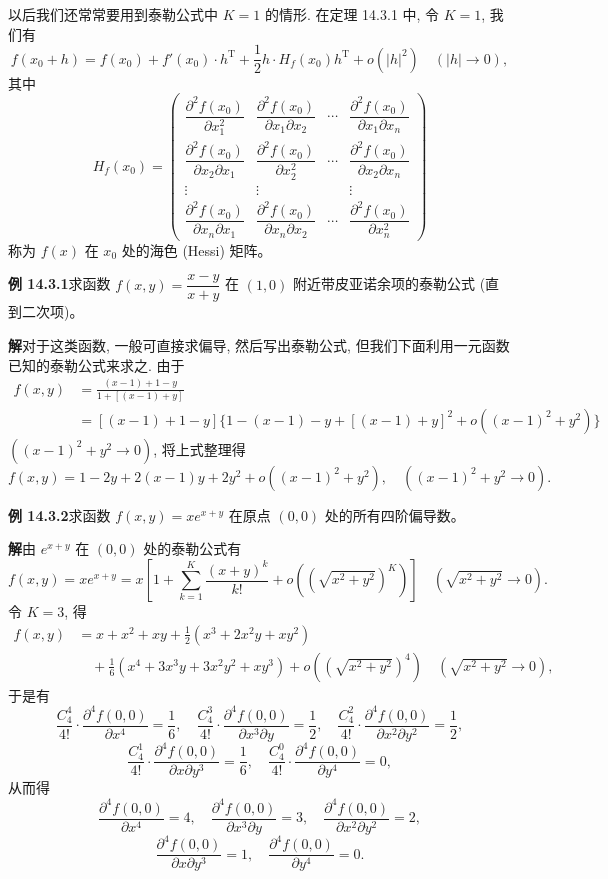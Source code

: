 \documentclass[UTF8,12pt,a4paper,fontset=fandol]{ctexart}
\begin{document}
以后我们还常常要用到泰勒公式中 $K=1$ 的情形. 在定理 14.3.1 中, 令 $K=1$, 我们有
\[
  f(x_0+h)=f(x_0)+f'(x_0)\cdot h^\mathrm T
  +\frac12 h\cdot H_f(x_0)h^\mathrm T+o(|h|^2)
  \quad(|h|\to0),
\]
其中
\[
  H_f(x_0)=
  \begin{pmatrix}
    \dfrac{\partial^2 f(x_0)}{\partial x_1^2} &
    \dfrac{\partial^2 f(x_0)}{\partial x_1\partial x_2} &
    \cdots &
    \dfrac{\partial^2 f(x_0)}{\partial x_1\partial x_n}\\
    \dfrac{\partial^2 f(x_0)}{\partial x_2\partial x_1} &
    \dfrac{\partial^2 f(x_0)}{\partial x_2^2} &
    \cdots &
    \dfrac{\partial^2 f(x_0)}{\partial x_2\partial x_n}\\
    \vdots & \vdots & & \vdots\\
    \dfrac{\partial^2 f(x_0)}{\partial x_n\partial x_1} &
    \dfrac{\partial^2 f(x_0)}{\partial x_n\partial x_2} &
    \cdots &
    \dfrac{\partial^2 f(x_0)}{\partial x_n^2}
  \end{pmatrix}
\]
称为 $f(x)$ 在 $x_0$ 处的海色 (Hessi) 矩阵。

\noindent\textbf{例 14.3.1}\quad 求函数 $f(x,y)=\dfrac{x-y}{x+y}$ 在 $(1,0)$ 附近带皮亚诺余项的泰勒公式 (直到二次项)。

\noindent\textbf{解}\quad 对于这类函数, 一般可直接求偏导, 然后写出泰勒公式, 但我们下面利用一元函数已知的泰勒公式来求之. 由于
\[
\begin{aligned}
  f(x,y)
  &=\frac{(x-1)+1-y}{1+[(x-1)+y]}\\
  &=[(x-1)+1-y]\{1-(x-1)-y+[(x-1)+y]^2
  +o((x-1)^2+y^2)\}
\end{aligned}
\]
$((x-1)^2+y^2\to0)$, 将上式整理得
\[
  f(x,y)=1-2y+2(x-1)y+2y^2+o((x-1)^2+y^2),
  \quad ((x-1)^2+y^2\to0).
\]

\noindent\textbf{例 14.3.2}\quad 求函数 $f(x,y)=xe^{x+y}$ 在原点 $(0,0)$ 处的所有四阶偏导数。

\noindent\textbf{解}\quad 由 $e^{x+y}$ 在 $(0,0)$ 处的泰勒公式有
\[
  f(x,y)=xe^{x+y}
  =x\left[1+\sum_{k=1}^K\frac{(x+y)^k}{k!}
  +o\left((\sqrt{x^2+y^2})^K\right)\right]
  \quad(\sqrt{x^2+y^2}\to0).
\]
令 $K=3$, 得
\[
\begin{aligned}
  f(x,y)
  &=x+x^2+xy+\frac12(x^3+2x^2y+xy^2)\\
  &\quad+\frac16(x^4+3x^3y+3x^2y^2+xy^3)
  +o\left((\sqrt{x^2+y^2})^4\right)
  \quad(\sqrt{x^2+y^2}\to0),
\end{aligned}
\]
于是有
\[
  \frac{C_4^4}{4!}\cdot\frac{\partial^4 f(0,0)}{\partial x^4}=\frac16,\quad
  \frac{C_4^3}{4!}\cdot\frac{\partial^4 f(0,0)}{\partial x^3\partial y}=\frac12,\quad
  \frac{C_4^2}{4!}\cdot\frac{\partial^4 f(0,0)}{\partial x^2\partial y^2}=\frac12,
\]
\[
  \frac{C_4^1}{4!}\cdot\frac{\partial^4 f(0,0)}{\partial x\partial y^3}=\frac16,\quad
  \frac{C_4^0}{4!}\cdot\frac{\partial^4 f(0,0)}{\partial y^4}=0,
\]
从而得
\[
  \frac{\partial^4 f(0,0)}{\partial x^4}=4,\quad
  \frac{\partial^4 f(0,0)}{\partial x^3\partial y}=3,\quad
  \frac{\partial^4 f(0,0)}{\partial x^2\partial y^2}=2,
\]
\[
  \frac{\partial^4 f(0,0)}{\partial x\partial y^3}=1,\quad
  \frac{\partial^4 f(0,0)}{\partial y^4}=0.
\]
\end{document}
